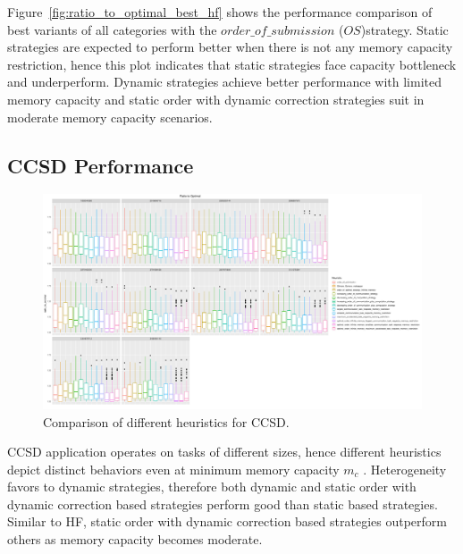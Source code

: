 \documentclass[runningheads]{llncs} %
\begin{document}
 
Figure~\ref{fig:ratio_to_optimal_best_hf} shows the performance comparison of best variants of all categories with the $order\_of\_submission$ ($OS$)strategy. Static strategies are expected to perform better when there is not any memory capacity restriction, hence this plot indicates that static strategies face capacity bottleneck and underperform. Dynamic strategies achieve better performance with limited memory capacity and static order with dynamic correction strategies suit in moderate memory capacity scenarios.

\subsection{CCSD Performance}

	\begin{figure}[htb]
	\includegraphics[scale=0.3]{../ExperimentalResults/ratio_to_optimal_ccsd.pdf}
	\caption{Comparison of different heuristics for CCSD.}
	\label{fig:ratio_to_optimal_ccsd}
	\end{figure}	

CCSD application operates on tasks of different sizes, hence different heuristics depict distinct behaviors even at minimum memory capacity $m_c$ . Heterogeneity favors to dynamic strategies, therefore both dynamic and static order with dynamic correction based strategies perform good than  static based strategies. Similar to HF,  static order with dynamic correction based strategies outperform others as memory capacity becomes moderate. 
\end{document}
